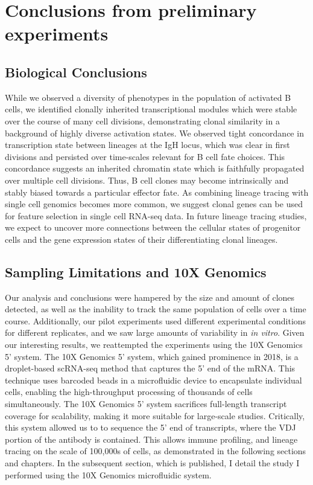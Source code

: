\section{Conclusions from preliminary experiments}

\subsection{Biological Conclusions}
While we observed a diversity of phenotypes in the population of activated B cells, we identified clonally inherited transcriptional modules which were stable over the course of many cell divisions, demonstrating clonal similarity in a background of highly diverse activation states. We observed tight concordance in transcription state between lineages at the IgH locus, which was clear in first divisions and persisted over time-scales relevant for B cell fate choices\cite{hodgkin_modifying_2018}. This concordance suggests an inherited chromatin state which is faithfully propagated over multiple cell divisions. Thus, B cell clones may become intrinsically and stably biased towards a particular effector fate. As combining lineage tracing with single cell genomics becomes more common, we suggest clonal genes can be used for feature selection in single cell RNA-seq data. In future lineage tracing studies, we expect to uncover more connections between the cellular states of progenitor cells and the gene expression states of their differentiating clonal lineages.

\subsection{Sampling Limitations and 10X Genomics}
Our analysis and conclusions were hampered by the size and amount of clones detected, as well as the inability to track the same population of cells over a time course. Additionally, our pilot experiments used different experimental conditions for different replicates, and we saw large amounts of variability in \textit{in vitro}. Given our interesting results, we reattempted the experiments using the 10X Genomics 5' system. The 10X Genomics 5' system, which gained prominence in 2018, is a droplet-based scRNA-seq method that captures the 5' end of the mRNA. This technique uses barcoded beads in a microfluidic device to encapsulate individual cells, enabling the high-throughput processing of thousands of cells simultaneously. The 10X Genomics 5' system sacrifices full-length transcript coverage for scalability, making it more suitable for large-scale studies. Critically, this system allowed us to to sequence the 5' end of transcripts, where the VDJ portion of the antibody is contained. This allows immune profiling, and lineage tracing on the scale of 100,000s of cells, as demonstrated in the following sections and chapters. In the subsequent section, which is published\cite{swift2023lineage}, I detail the study I performed using the 10X Genomics microfluidic system. 

